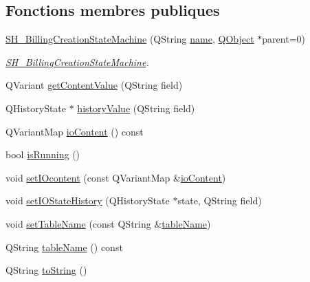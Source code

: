 \subsection*{Fonctions membres publiques}
\begin{DoxyCompactItemize}
\item 
\hyperlink{classSimpleHotel_1_1SH__BillingCreationStateMachine_a8c7d39e11d0ced1fd9c27a5550465b86}{S\-H\-\_\-\-Billing\-Creation\-State\-Machine} (Q\-String \hyperlink{classSimpleHotel_1_1SH__NamedObject_ad144716345034c91cface8f3163a799e}{name}, \hyperlink{classQObject}{Q\-Object} $\ast$parent=0)
\begin{DoxyCompactList}\small\item\em \hyperlink{classSimpleHotel_1_1SH__BillingCreationStateMachine}{S\-H\-\_\-\-Billing\-Creation\-State\-Machine}. \end{DoxyCompactList}\item 
Q\-Variant \hyperlink{classSimpleHotel_1_1SH__InOutStateMachine_a4e2afab69163c7ce53dd6a40c793d5dc}{get\-Content\-Value} (Q\-String field)
\item 
Q\-History\-State $\ast$ \hyperlink{classSimpleHotel_1_1SH__InOutStateMachine_af9de98943b9428ed4144bc6695c1ada0}{history\-Value} (Q\-String field)
\item 
Q\-Variant\-Map \hyperlink{classSimpleHotel_1_1SH__InOutStateMachine_a378618937520bc65b6e25cd187a92aad}{io\-Content} () const 
\item 
bool \hyperlink{classSimpleHotel_1_1SH__GenericStateMachine_a23d9e26143a6732fa5a8f540eb827e03}{is\-Running} ()
\item 
void \hyperlink{classSimpleHotel_1_1SH__InOutStateMachine_a60245aa45ba2b9720965412774e123fb}{set\-I\-Ocontent} (const Q\-Variant\-Map \&\hyperlink{classSimpleHotel_1_1SH__InOutStateMachine_a378618937520bc65b6e25cd187a92aad}{io\-Content})
\item 
void \hyperlink{classSimpleHotel_1_1SH__InOutStateMachine_a7a6675495f101d29e8eb86df84961795}{set\-I\-O\-State\-History} (Q\-History\-State $\ast$state, Q\-String field)
\item 
void \hyperlink{classSimpleHotel_1_1SH__InOutStateMachine_adae23a212e9ba1e590f062994cd367a6}{set\-Table\-Name} (const Q\-String \&\hyperlink{classSimpleHotel_1_1SH__InOutStateMachine_a9fd170fd458e524ac0629b64d5323a45}{table\-Name})
\item 
Q\-String \hyperlink{classSimpleHotel_1_1SH__InOutStateMachine_a9fd170fd458e524ac0629b64d5323a45}{table\-Name} () const 
\item 
Q\-String \hyperlink{classSimpleHotel_1_1SH__GenericStateMachine_ad6dd1d0986c40684410ed94f1f610b12}{to\-String} ()
\end{DoxyCompactItemize}
